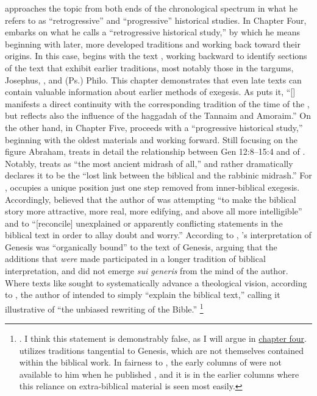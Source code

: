 \vermes approaches the topic from both ends of the chronological spectrum in what he refers to as ``retrogressive'' and ``progressive'' historical studies. In Chapter Four, \vermes embarks on what he calls a ``retrogressive historical study,'' by which he means beginning with later, more developed traditions and working back toward their origins. In this case, \vermes begins with the  text \sefer, working backward to identify sections of the text that exhibit earlier traditions, most notably those in the targums, Josephus, \jub, and (Ps.) Philo. This chapter demonstrates that even late texts can contain valuable information about earlier methods of exegesis. As \vermes puts it, ``[\sefer] manifests a direct continuity with the corresponding tradition of the time of the \secondtemple, but reflects also the influence of the haggadah of the Tannaim and Amoraim.''%
    \autocite[95]{vermes1961}
On the other hand, in Chapter Five, \vermes proceeds with a ``progressive historical study,'' beginning with the oldest materials and working forward. Still focusing on the figure Abraham, \vermes treats in detail the relationship between Gen 12:8--15:4 and  of \ga. Notably, \vermes treats \ga as ``the most ancient midrash of all,''%
    \autocite[124]{vermes1961}
and rather dramatically declares it to be the ``lost link between the biblical and the rabbinic midrash.''%
    \autocite[124]{vermes1961}
For \vermes, \ga occupies a unique position just one step removed from inner-biblical exegesis. Accordingly, \vermes believed that the author of \ga was attempting ``to make the biblical story more attractive, more real, more edifying, and above all more intelligible'' and to ``[reconcile] unexplained or apparently conflicting statements in the biblical text in order to allay doubt and worry.''%
    \autocite[126]{vermes1961}
According to \vermes, \ga's interpretation of Genesis was ``organically bound'' to the text of Genesis, arguing that the additions that \emph{were} made participated in a longer tradition of biblical interpretation, and did not emerge \emph{sui generis} from the mind of the author. Where texts like \jub sought to systematically advance a theological vision, according to \vermes, the author of \ga intended to simply ``explain the biblical text,'' calling it illustrative of ``the unbiased rewriting of the Bible.''%
    \footnote{%
        \Cite[126]{vermes1961}. I think this statement is demonstrably false, as I will argue in \hyperref[chap:ga]{chapter four}. \GA utilizes traditions tangential to Genesis, which are not themselves contained within the biblical work. In fairness to \vermes, the early columns of \ga were not available to him when he published , and it is in the earlier columns where this reliance on extra-biblical material is seen most easily.}

